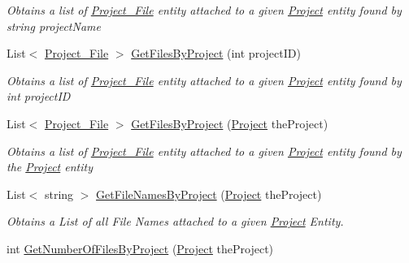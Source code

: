 \begin{DoxyCompactItemize}
\begin{DoxyCompactList}\small\item\em Obtains a list of \hyperlink{class_k_change_logger_1_1_project___file}{Project\-\_\-\-File} entity attached to a given \hyperlink{class_k_change_logger_1_1_project}{Project} entity found by string project\-Name \end{DoxyCompactList}\item 
List$<$ \hyperlink{class_k_change_logger_1_1_project___file}{Project\-\_\-\-File} $>$ \hyperlink{class_k_change_logger_1_1_k_change_data_context_data_context_a791a413248895aa2989e7dadaadacf93}{Get\-Files\-By\-Project} (int project\-I\-D)
\begin{DoxyCompactList}\small\item\em Obtains a list of \hyperlink{class_k_change_logger_1_1_project___file}{Project\-\_\-\-File} entity attached to a given \hyperlink{class_k_change_logger_1_1_project}{Project} entity found by int project\-I\-D \end{DoxyCompactList}\item 
List$<$ \hyperlink{class_k_change_logger_1_1_project___file}{Project\-\_\-\-File} $>$ \hyperlink{class_k_change_logger_1_1_k_change_data_context_data_context_acc21a8ac38bdd4d4be075cfa38493ca8}{Get\-Files\-By\-Project} (\hyperlink{class_k_change_logger_1_1_project}{Project} the\-Project)
\begin{DoxyCompactList}\small\item\em Obtains a list of \hyperlink{class_k_change_logger_1_1_project___file}{Project\-\_\-\-File} entity attached to a given \hyperlink{class_k_change_logger_1_1_project}{Project} entity found by the \hyperlink{class_k_change_logger_1_1_project}{Project} entity \end{DoxyCompactList}\item 
List$<$ string $>$ \hyperlink{class_k_change_logger_1_1_k_change_data_context_data_context_aa3097fb8bb21b1643145449fe466ac3d}{Get\-File\-Names\-By\-Project} (\hyperlink{class_k_change_logger_1_1_project}{Project} the\-Project)
\begin{DoxyCompactList}\small\item\em Obtains a List of all File Names attached to a given \hyperlink{class_k_change_logger_1_1_project}{Project} Entity. \end{DoxyCompactList}\item 
int \hyperlink{class_k_change_logger_1_1_k_change_data_context_data_context_a49b7ce997b54fa506eddcacc6a5dfc51}{Get\-Number\-Of\-Files\-By\-Project} (\hyperlink{class_k_change_logger_1_1_project}{Project} the\-Project)

\end{DoxyCompactItemize}
